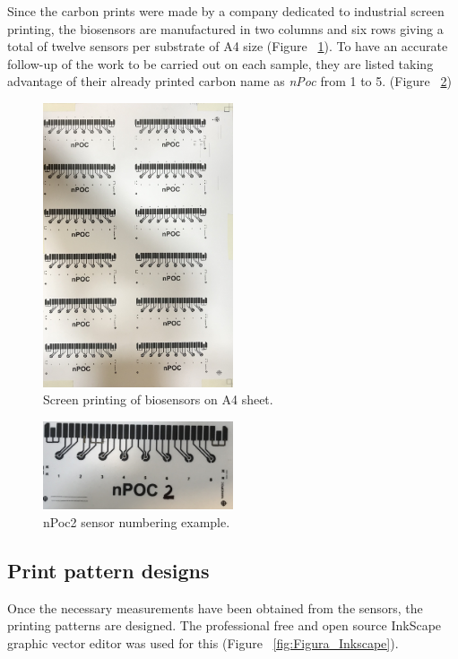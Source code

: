 Since the carbon prints were made by a company dedicated to industrial screen printing, the biosensors are manufactured in two columns and six rows giving a total of twelve sensors per substrate of A4 size (Figure ~\ref{fig:Figura_sensores_hoja_A4}). To have an accurate follow-up of the work to be carried out on each sample, they are listed taking advantage of their already printed carbon name as \textit{nPoc} from 1 to 5. (Figure ~\ref{fig:Figura_ejemplo_numeracion_nPoc})

\begin{figure}[H]
  \centering
    \includegraphics[width=0.5\textwidth]{Figures/Figura_sensores_hoja_A4}
  \caption{Screen printing of biosensors on A4 sheet.}
  \label{fig:Figura_sensores_hoja_A4}
\end{figure}

\begin{figure}[H]
  \centering
    \includegraphics[width=0.5\textwidth]{Figures/Figura_ejemplo_numeracion_nPoc}
  \caption{nPoc2 sensor numbering example.}
  \label{fig:Figura_ejemplo_numeracion_nPoc}
\end{figure}

\subsection{Print pattern designs}
\label{subsec:diseno_impresion}
Once the necessary measurements have been obtained from the sensors, the printing patterns are designed. The professional free and open source InkScape graphic vector editor was used for this \cite{Inkscape} (Figure ~\ref{fig:Figura_Inkscape}).

